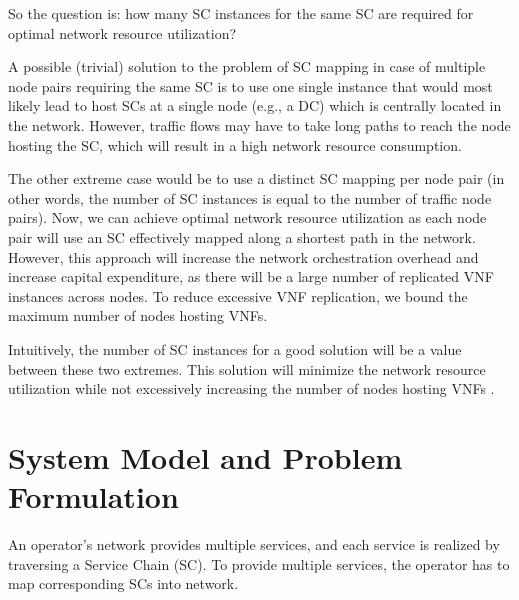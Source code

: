\documentclass[12pt]{article}
\begin{document}
So the question is: how many SC instances for the same SC are required for optimal network resource utilization?

A possible (trivial) solution to the problem of SC mapping in case of multiple node pairs requiring the same SC is to use one single instance that would most likely lead to host SCs at a single node (e.g., a DC) which is centrally located in the network. However, traffic flows may have to take long paths to reach the node hosting the SC, which will result in a high network resource consumption.

The other extreme case would be to use a distinct SC mapping per node pair (in other words, the number of SC instances is equal to the number of traffic node pairs). Now, we can achieve optimal network resource utilization as each node pair will use an SC effectively mapped along a shortest path in the network. However, this approach will increase the network orchestration overhead and increase capital expenditure, as there will be a large number of replicated VNF instances across nodes. To reduce excessive VNF replication, we bound the maximum number of nodes hosting VNFs.

Intuitively, the number of SC instances for a good solution will be a value between these two extremes. This solution will minimize the network resource utilization while not excessively increasing the number of nodes hosting VNFs \cite{Fourth}.
\section{System Model and Problem Formulation}
An operator’s network provides multiple services, and each service is realized by traversing a Service Chain (SC). To provide multiple services, the operator has to map corresponding SCs into network.
\end{document}
